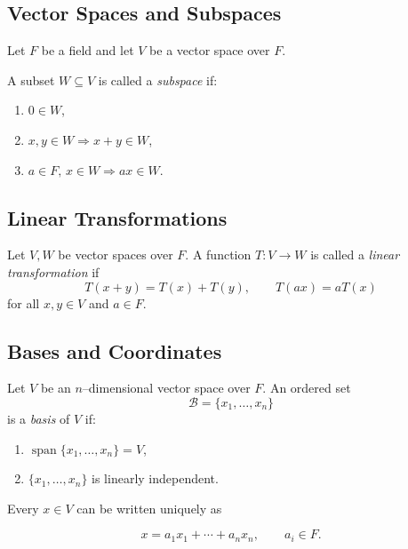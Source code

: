 \documentclass[12pt]{article}
\theoremstyle{remark}
\theoremstyle{definition}
\begin{document}
\subsection*{Vector Spaces and Subspaces}

Let $F$ be a field and let $V$ be a vector space over $F$.

A subset $W \subseteq V$ is called a \emph{subspace} if:
\begin{enumerate}
    \item $0 \in W$,
    \item $x,y \in W \Rightarrow x+y \in W$,
    \item $a \in F,\, x \in W \Rightarrow ax \in W$.
\end{enumerate}

\begin{center}
\end{center}

\subsection*{Linear Transformations}

Let $V,W$ be vector spaces over $F$.
A function $T: V \to W$ is called a \emph{linear transformation} if
\[
T(x+y) = T(x) + T(y), \qquad T(ax) = aT(x)
\]
for all $x,y \in V$ and $a \in F$.

\subsection*{Bases and Coordinates}

Let $V$ be an $n$--dimensional vector space over $F$.
An ordered set
\[
\mathcal{B} = \{x_1,\dots,x_n\}
\]
is a \emph{basis} of $V$ if:
\begin{enumerate}
    \item $\operatorname{span}\{x_1,\dots,x_n\} = V$,
    \item $\{x_1,\dots,x_n\}$ is linearly independent.
\end{enumerate}

Every $x \in V$ can be written uniquely as

\[
x = a_1 x_1 + \cdots + a_n x_n,
\qquad a_i \in F.
\]
\end{document}
